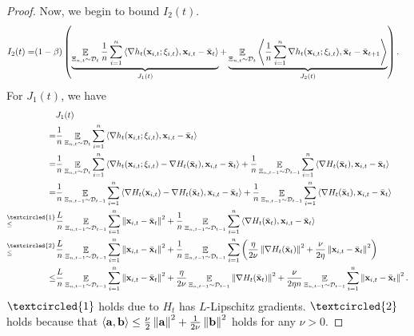 \documentclass{article}
\begin{document}
\begin{proof}
Now, we begin to bound $I_2(t)$.
\begin{align}
\nonumber
I_2(t) = & (1-\beta)  \left( \underbrace{ \mathop{\mathbb{E}}_{ \Xi_{n,t} \sim \mathcal{D}_{t} }\frac{1}{n}\sum_{i=1}^n\left\langle\nabla h_t({\bf x}_{i,t}; \xi_{i,t}), {\bf x}_{i,t} - \bar{{\bf x}}_t  \right\rangle }_{J_1(t)} +  \underbrace{ \mathop{\mathbb{E}}_{ \Xi_{n,t} \sim \mathcal{D}_{t} }\left\langle\frac{1}{n}\sum_{i=1}^n \nabla h_t({\bf x}_{i,t};\xi_{i,t}), \bar{{\bf x}}_t - \bar{{\bf x}}_{t+1}  \right\rangle}_{J_2(t)} \right).
\end{align} For $J_1(t)$, we have
\begin{align}
\nonumber
& J_1(t) \\ \nonumber 
= & \frac{1}{n}\EE_{ \Xi_{n,t} \sim \Dcal_{t} }\sum_{i=1}^n\lrangle{\nabla h_t(\x_{i,t}; \xi_{i,t}), \x_{i,t} - \bar{\x}_t } \\ \nonumber
= & \frac{1}{n}\EE_{ \Xi_{n,t} \sim \Dcal_{t} } \sum_{i=1}^n\lrangle{\nabla h_t(\x_{i,t}; \xi_{i,t}) - \nabla H_t(\bar{\x}_t), \x_{i,t} - \bar{\x}_t } + \frac{1}{n}\EE_{ \Xi_{n,t-1} \sim \Dcal_{t-1} }\sum_{i=1}^n\lrangle{\nabla H_t(\bar{\x}_t), \x_{i,t} - \bar{\x}_t } \\ \nonumber
= & \frac{1}{n}\EE_{ \Xi_{n,t-1} \sim \Dcal_{t-1} }\sum_{i=1}^n\lrangle{\nabla H_t(\x_{i,t}) - \nabla H_t(\bar{\x}_t), \x_{i,t} - \bar{\x}_t } + \frac{1}{n}\EE_{ \Xi_{n,t-1} \sim \Dcal_{t-1} }\sum_{i=1}^n\lrangle{\nabla H_t(\bar{\x}_t), \x_{i,t} - \bar{\x}_t } \\ \nonumber
\refabovecir{\le}{\textcircled{1}} & \frac{L}{n}\EE_{ \Xi_{n,t-1} \sim \Dcal_{t-1} }\sum_{i=1}^n \lrnorm{\x_{i,t} - \bar{\x}_t}^2 + \frac{1}{n}\EE_{ \Xi_{n,t-1} \sim \Dcal_{t-1} }\sum_{i=1}^n\lrangle{\nabla H_t(\bar{\x}_t), \x_{i,t} - \bar{\x}_t } \\ \nonumber
\refabovecir{\le}{\textcircled{2}} & \frac{L}{n}\EE_{ \Xi_{n,t-1} \sim \Dcal_{t-1} }\sum_{i=1}^n \lrnorm{\x_{i,t} - \bar{\x}_t}^2 + \frac{1}{n}\EE_{ \Xi_{n,t-1} \sim \Dcal_{t-1} }\sum_{i=1}^n\lrincir{\frac{\eta}{2\nu}\lrnorm{\nabla H_t(\bar{\x}_t)}^2 + \frac{\nu}{2\eta}\lrnorm{\x_{i,t} - \bar{\x}_t }^2 } \\ \label{equa_theorem_temp0}
\le & \frac{L}{n}\EE_{ \Xi_{n,t-1} \sim \Dcal_{t-1} }\sum_{i=1}^n \lrnorm{\x_{i,t} - \bar{\x}_t}^2 + \frac{\eta}{2\nu}\EE_{ \Xi_{n,t-1} \sim \Dcal_{t-1} }\lrnorm{\nabla H_t(\bar{\x}_t)}^2 + \frac{\nu}{2\eta n}\EE_{ \Xi_{n,t-1} \sim \Dcal_{t-1} }\sum_{i=1}^n\lrnorm{\x_{i,t} - \bar{\x}_t }^2. 
\end{align} $\textcircled{1}$ holds due to $H_t$ has $L$-Lipschitz gradients. $\textcircled{2}$ holds because that $\left\langle{\bf a},{\bf b} \right\rangle \le \frac{\nu}{2}\left\lVert{\bf a}\right\rVert^2 + \frac{1}{2\nu}\left\lVert{\bf b}\right\rVert^2$ holds for any $\nu>0$. 



\end{proof}
\end{document}

